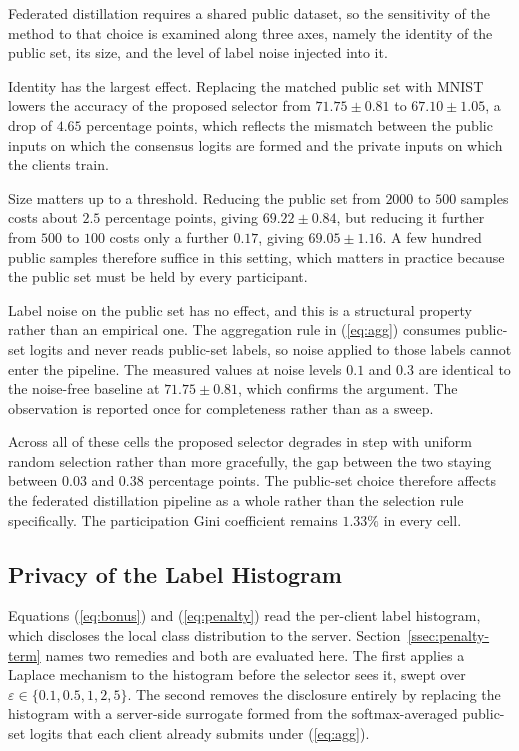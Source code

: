 \documentclass[journal]{IEEEtran}
\begin{document}
{Federated distillation requires a shared public dataset, so the sensitivity of the method to that choice is examined along three axes, namely the identity of the public set, its size, and the level of label noise injected into it.

Identity has the largest effect. Replacing the matched public set with MNIST lowers the accuracy of the proposed selector from $71.75 \pm 0.81$ to $67.10 \pm 1.05$, a drop of $4.65$ percentage points, which reflects the mismatch between the public inputs on which the consensus logits are formed and the private inputs on which the clients train.

Size matters up to a threshold. Reducing the public set from $2000$ to $500$ samples costs about $2.5$ percentage points, giving $69.22 \pm 0.84$, but reducing it further from $500$ to $100$ costs only a further $0.17$, giving $69.05 \pm 1.16$. A few hundred public samples therefore suffice in this setting, which matters in practice because the public set must be held by every participant.

Label noise on the public set has no effect, and this is a structural property rather than an empirical one. The aggregation rule in (\ref{eq:agg}) consumes public-set logits and never reads public-set labels, so noise applied to those labels cannot enter the pipeline. The measured values at noise levels $0.1$ and $0.3$ are identical to the noise-free baseline at $71.75 \pm 0.81$, which confirms the argument. The observation is reported once for completeness rather than as a sweep.

Across all of these cells the proposed selector degrades in step with uniform random selection rather than more gracefully, the gap between the two staying between $0.03$ and $0.38$ percentage points. The public-set choice therefore affects the federated distillation pipeline as a whole rather than the selection rule specifically. The participation Gini coefficient remains $1.33\%$ in every cell.

\subsection{Privacy of the Label Histogram}
\label{ssec:exp-privacy}

Equations (\ref{eq:bonus}) and (\ref{eq:penalty}) read the per-client label histogram, which discloses the local class distribution to the server. Section~\ref{ssec:penalty-term} names two remedies and both are evaluated here. The first applies a Laplace mechanism to the histogram before the selector sees it, swept over $\varepsilon \in \{0.1, 0.5, 1, 2, 5\}$. The second removes the disclosure entirely by replacing the histogram with a server-side surrogate formed from the softmax-averaged public-set logits that each client already submits under (\ref{eq:agg}).

}
\end{document}

